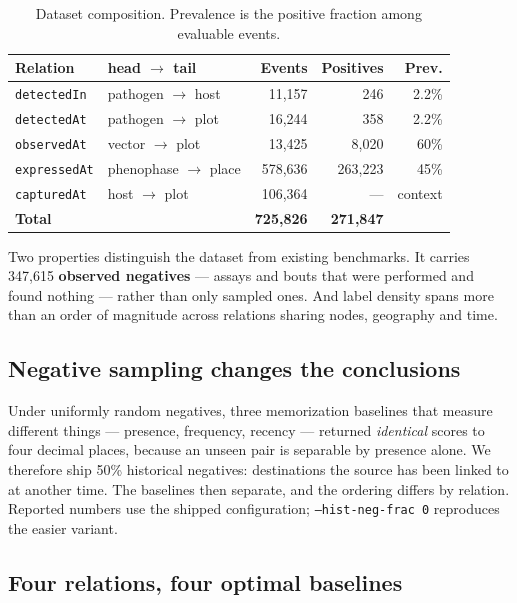 \begin{table}[t]
\centering
\caption{Dataset composition. Prevalence is the positive fraction among
evaluable events.}
\label{tab:dataset}
\small
\begin{tabular}{llrrr}
\toprule
\textbf{Relation} & \textbf{head $\rightarrow$ tail} & \textbf{Events} &
\textbf{Positives} & \textbf{Prev.} \\
\midrule
\texttt{detectedIn}  & pathogen $\rightarrow$ host    & 11{,}157  & 246 & 2.2\% \\
\texttt{detectedAt}  & pathogen $\rightarrow$ plot    & 16{,}244  & 358 & 2.2\% \\
\texttt{observedAt}  & vector $\rightarrow$ plot      & 13{,}425  & 8{,}020 & 60\% \\
\texttt{expressedAt} & phenophase $\rightarrow$ place & 578{,}636 & 263{,}223 & 45\% \\
\texttt{capturedAt}  & host $\rightarrow$ plot        & 106{,}364 & --- & context \\
\midrule
\textbf{Total} & & \textbf{725{,}826} & \textbf{271{,}847} & \\
\bottomrule
\end{tabular}
\end{table}

Two properties distinguish the dataset from existing benchmarks. It carries
347{,}615 \textbf{observed negatives} --- assays and bouts that were performed
and found nothing --- rather than only sampled ones. And label density spans
more than an order of magnitude across relations sharing nodes, geography and
time.

\subsection{Negative sampling changes the conclusions}

Under uniformly random negatives, three memorization baselines that measure
different things --- presence, frequency, recency --- returned \emph{identical}
scores to four decimal places, because an unseen pair is separable by presence
alone. We therefore ship 50\% historical negatives: destinations the source has
been linked to at another time. The baselines then separate, and the ordering
differs by relation. Reported numbers use the shipped configuration;
\texttt{--hist-neg-frac 0} reproduces the easier variant.

\subsection{Four relations, four optimal baselines}

